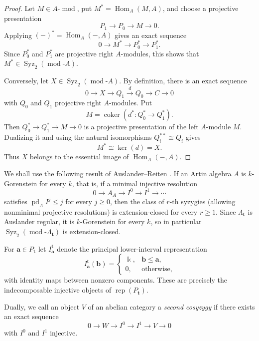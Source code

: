 \documentclass[10pt,a4paper]{amsart}
\newcommand{\Rep}{\operatorname{rep}}
\newcommand{\Hom}{\operatorname{Hom}}
\newcommand{\modcat}{\operatorname{mod}}
\begin{document}
\begin{proof}
Let $M\in A\text{-}\modcat$, put $M^*=\Hom_A(M,A)$, and choose a projective
presentation
$$
P_1\longrightarrow P_0\longrightarrow M\longrightarrow0.
$$
Applying $(-)^*=\Hom_A(-,A)$ gives an exact sequence
$$
0\longrightarrow M^*\longrightarrow P_0^*\longrightarrow P_1^*.
$$
Since $P_0^*$ and $P_1^*$ are projective right $A$-modules, this shows that
$M^*\in\operatorname{Syz}_2(\modcat\text{-}A)$.

Conversely, let $X\in\operatorname{Syz}_2(\modcat\text{-}A)$.  By definition,
there is an exact sequence
$$
0\longrightarrow X\longrightarrow Q_1\xrightarrow{d}Q_0
\longrightarrow C\longrightarrow0
$$
with $Q_0$ and $Q_1$ projective right $A$-modules.  Put
$$
M=\operatorname{coker}(d^*:Q_0^*\longrightarrow Q_1^*).
$$
Then $Q_0^*\to Q_1^*\to M\to0$ is a projective presentation of the left
$A$-module $M$.  Dualizing it and using the natural isomorphisms
$Q_i^{**}\cong Q_i$ gives
$$
M^*\cong\ker(d)=X.
$$
Thus $X$ belongs to the essential image of $\Hom_A(-,A)$.
\end{proof}

We shall use the following result of Auslander--Reiten \cite{ARsyzygy}.  If an Artin algebra $A$ is $k$-Gorenstein for every $k$, that is, if a minimal injective resolution
\[
0\longrightarrow A_A\longrightarrow I^0\longrightarrow I^1\longrightarrow\cdots
\]
satisfies $\operatorname{pd}_A I^j\le j$ for every $j\ge0$, then
the class of $r$-th syzygies (allowing nonminimal projective resolutions) is extension-closed for every $r\ge1$.
Since $\Lambda_{\mathbf t}$ is Auslander regular, it is $k$-Gorenstein for every $k$, so in particular
$\operatorname{Syz}_2(\modcat\text{-}\Lambda_{\mathbf t})$ is extension-closed.

For $\mathbf a\in P_{\mathbf t}$ let $I^{\mathbf t}_{\mathbf a}$ denote the principal lower-interval representation
\[
I^{\mathbf t}_{\mathbf a}(\mathbf b)=
\begin{cases}
\Bbbk,&\mathbf b\le\mathbf a,\\
0,&\text{otherwise},
\end{cases}
\]
with identity maps between nonzero components.  These are precisely the indecomposable injective objects of $\Rep(P_{\mathbf t})$.

Dually, we call an object $V$ of an abelian category a \emph{second cosyzygy}
if there exists an exact sequence
$$
0\longrightarrow W\longrightarrow I^0\longrightarrow I^1
\longrightarrow V\longrightarrow0
$$
with $I^0$ and $I^1$ injective.
\end{document}
